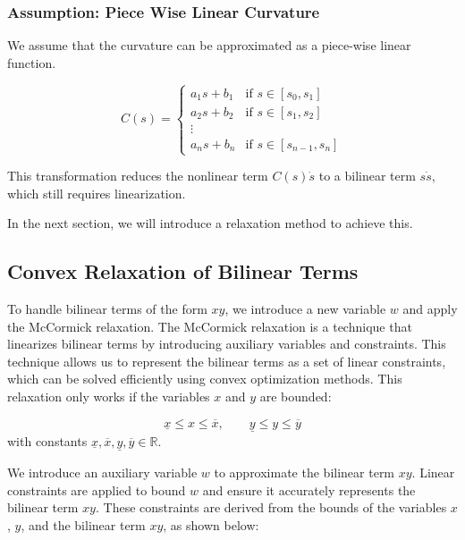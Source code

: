 \subsubsection{Assumption: Piece Wise Linear Curvature}

We assume that the curvature can be approximated as a piece-wise linear function.

\[
	C(s) = \begin{cases}
		a_1s+b_1 & \text{if } s \in [s_0, s_1]     \\
		a_2s+b_2 & \text{if } s \in [s_1, s_2]     \\
		\vdots                                     \\
		a_ns+b_n & \text{if } s \in [s_{n-1}, s_n]
	\end{cases}
\]

This transformation reduces the nonlinear term $C(s)\dot{s}$ to a bilinear term $s\dot{s}$, which still requires linearization.

In the next section, we will introduce a relaxation method to achieve this.

\subsection{Convex Relaxation of Bilinear Terms} \label{subsec:convex_relaxation_for_bilinear_terms}

To handle bilinear terms of the form $xy$, we introduce a new variable $w$ and apply the McCormick relaxation.
The McCormick relaxation is a technique that linearizes bilinear terms by introducing auxiliary variables and constraints.
This technique allows us to represent the bilinear terms as a set of linear constraints, which can be solved efficiently using convex optimization
methods.
This relaxation only works if the variables $x$ and $y$ are bounded:

\[ \underline{x} \leq x \leq \overline{x}, \qquad
	\underline{y} \leq y \leq \overline{y} \] with constants $\underline{x}, \overline{x}, \underline{y}, \overline{y} \in \mathbb{R}$.

We introduce an auxiliary variable $w$ to approximate the bilinear term $xy$.
Linear constraints are applied to bound $w$ and ensure it accurately represents the bilinear term $xy$.
These constraints are derived from the bounds of the variables $x$, $y$, and the bilinear term $xy$, as shown below:

